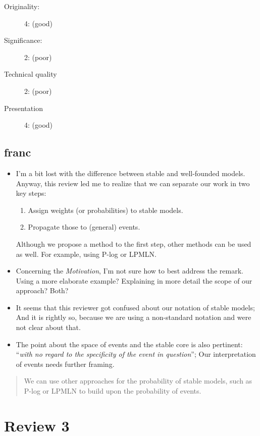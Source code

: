 \documentclass{tlp}
\begin{document}
\begin{description}
    \item[Originality:] 4: (good)
    \item[Significance:]  2: (poor)
    \item[Technical quality] 2: (poor)
    \item[Presentation] 4: (good)
\end{description}

\subsection*{franc}
\begin{itemize}
  \item I'm a bit lost with the difference between stable and well-founded models. Anyway, this review led me to realize that we can separate our work in two key steps:
  \begin{enumerate}
    \item Assign weights (or probabilities) to stable models.
    \item Propagate those to (general) events.
  \end{enumerate}
  Although we propose a method to the first step, other methods can be used as well. For example, using P-log or LPMLN.
  \item Concerning the \emph{Motivation}, I'm not sure how to best address the remark. Using a more elaborate example? Explaining in more detail the scope of our approach? Both?
  \item It seems that this reviewer got confused about our notation of stable models; And it is rightly so, because we are using a non-standard notation and were not clear about that. 
  \item The point about the space of events and the stable core is also pertinent: ``\textit{with no regard to the specificity of the event in question}''; Our interpretation of events needs further framing.
\end{itemize}
\begin{quote}
  We can use other approaches for the probability of stable models, such as P-log or LPMLN to build upon the probability of events. 
\end{quote}

\section{Review 3}
\end{document}

